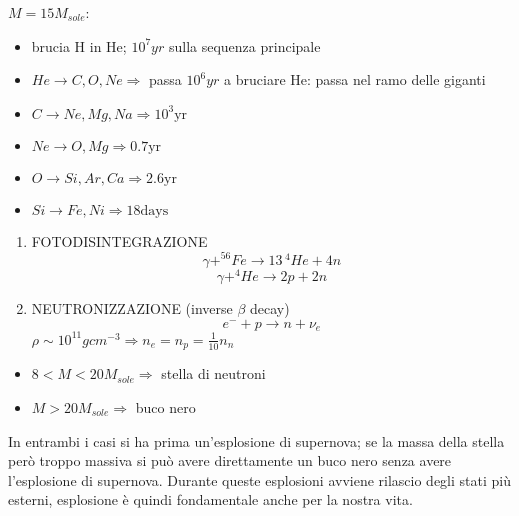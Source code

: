 \documentclass[a4paper,11pt]{report}
\theoremstyle{remark}
\theoremstyle{definition}
\begin{document}
$M = 15 M_{sole}$: 
\begin{itemize}
    \item brucia H in He;  $10^7 yr$ sulla sequenza principale
    \item $He \rightarrow C,O,Ne \Rightarrow$ passa $10^6 yr$ a bruciare He: passa nel ramo delle giganti
    \item $C \rightarrow Ne,Mg, Na \Rightarrow 10^3 \mbox{yr}$ 
    \item $Ne \rightarrow O,Mg \Rightarrow 0.7 \mbox{yr}$
    \item $O \rightarrow Si,Ar,Ca \Rightarrow 2.6 \mbox{yr}$
    \item $Si\rightarrow Fe, Ni \Rightarrow 18 \mbox{days}$
\end{itemize}
\begin{enumerate}
    \item FOTODISINTEGRAZIONE 
    \begin{equation*}
        \gamma + ^{56}Fe \rightarrow 13 \,  ^4He + 4n 
    \end{equation*}
    \begin{equation*}
        \gamma + ^4He \rightarrow 2p + 2n 
    \end{equation*}
    \item NEUTRONIZZAZIONE (inverse $\beta$ decay)
    \begin{equation*}
        e^- + p \rightarrow n + \nu_e
    \end{equation*}
    $\rho \sim 10^{11} gcm^{-3} \Rightarrow n_e=n_p = \frac{1}{10}n_n$ 
\end{enumerate}
\begin{itemize}
    \item $8 < M < 20M_{sole} \Rightarrow$ stella di neutroni
    \item $M > 20 M_{sole} \Rightarrow$ buco nero
\end{itemize}
In entrambi i casi si ha prima un'esplosione di supernova; se la massa della stella però troppo massiva si può avere direttamente un buco nero senza avere l'esplosione di supernova. Durante queste esplosioni avviene rilascio degli stati più esterni, esplosione è quindi fondamentale anche per la nostra vita.
\end{document}
